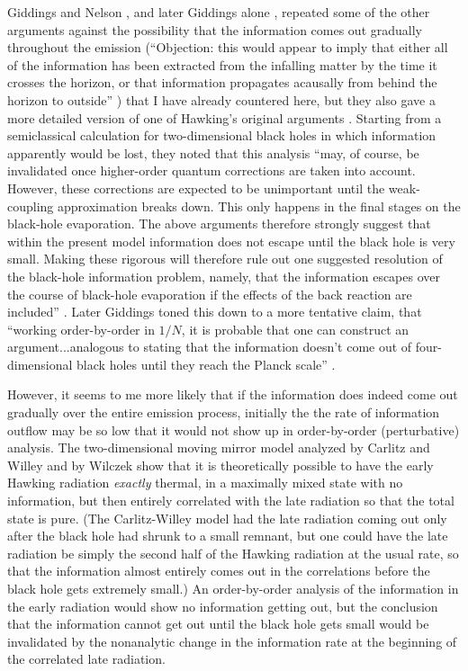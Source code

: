 \documentclass[12pt]{article}
\begin{document}
     Giddings and Nelson \cite{GidNel}, and later Giddings alone
\cite{Gid92b},
repeated some of the other arguments against the possibility that the
information comes out gradually throughout the emission (``Objection:
this
would appear to imply that either all of the information has been
extracted
from the infalling matter by the time it crosses the horizon, or that
information propagates acausally from behind the horizon to outside''
\cite{Gid92b}) that I have already countered here, but they also gave
a more
detailed version of one of Hawking's original arguments \cite{Haw76}.
Starting
from a semiclassical calculation for two-dimensional black holes in
which
information apparently would be lost, they noted that this analysis
``may, of
course, be invalidated once higher-order quantum corrections are
taken into
account.  However, these corrections are expected to be unimportant
until the
weak-coupling approximation breaks down.  This only happens in the
final stages
on the black-hole evaporation.  The above arguments therefore
strongly suggest
that within the present model information does not escape until the
black hole
is very small.  Making these rigorous will therefore rule out one
suggested
resolution of the black-hole information problem, namely, that the
information
escapes over the course of black-hole evaporation if the effects of
the back
reaction are included'' \cite{GidNel}.  Later Giddings toned this
down to a
more
tentative claim, that ``working order-by-order in $1/N$, it is
probable that
one can construct an argument...analogous to stating that the
information
doesn't come out of four-dimensional black holes until they reach the
Planck
scale'' \cite{Gid92b}.

     However, it seems to me more likely that if the information does
indeed
come out gradually over the entire emission process, initially the
the rate of
information outflow may be so low that it would not show up in
order-by-order
(perturbative) analysis.  The two-dimensional moving mirror model
\cite{DavFul} analyzed by Carlitz and Willey \cite{CW2}
and by Wilczek \cite{Wil} show that it is
theoretically possible to have the early Hawking radiation {\it
exactly}
thermal, in a maximally mixed state with no information, but then
entirely
correlated with the late radiation so that the total state is pure.
(The
Carlitz-Willey model had the late radiation coming out only after the
black
hole had shrunk to a small remnant, but one could have the late
radiation be
simply the second half of the Hawking radiation at the usual rate, so
that the
information almost entirely comes out in the correlations before the
black hole
gets extremely small.)  An order-by-order analysis of the information
in the
early radiation would show no information getting out, but the
conclusion that
the information cannot get out until the black hole gets small would
be
invalidated by the nonanalytic change in the information rate at the
beginning
of the correlated late radiation.
\end{document}
